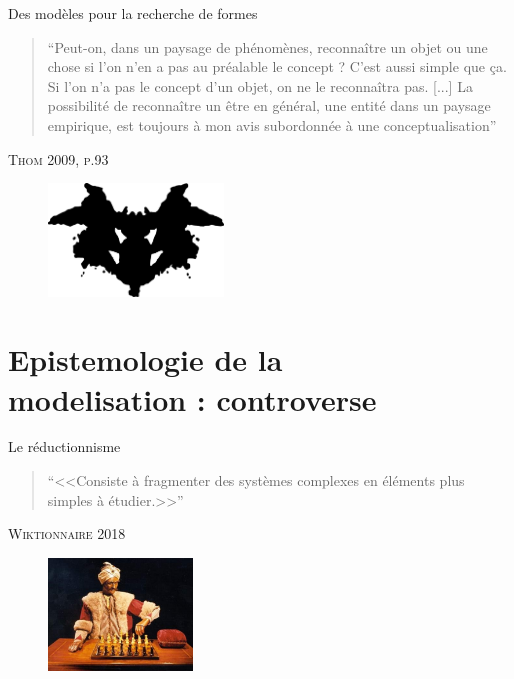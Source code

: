 \documentclass[newPxFont]{beamer}
\begin{document}
\begin{frame}[c]{Des modèles pour la recherche de formes}
\vspace{-1em}
\begin{quote}
  \enquote{Peut-on, dans un paysage de phénomènes, reconnaître un objet ou une chose si l'on n'en a pas au préalable le concept ? C'est aussi simple que ça. Si l'on n'a pas le concept d'un objet, on ne le reconnaîtra pas. [...] La possibilité de reconnaître un être en général, une entité dans un paysage empirique, est toujours à mon avis subordonnée à une conceptualisation}
\end{quote}
\hspace*{\fill}\textsc{Thom 2009, p.93}
\vspace{-0.5em}
\begin{figure}
 \includegraphics[height=3cm]{img/a_rorschach.png}
\end{figure}
\end{frame}

\section{Epistemologie de la\\ modelisation : controverse}
\begin{frame}[c]{Le réductionnisme}
\vspace{-1em}
\begin{quote}
  \enquote{<<Consiste à fragmenter des systèmes complexes en éléments plus simples à étudier.>>}
\end{quote}
\hspace*{\fill}\textsc{Wiktionnaire 2018}
\vspace{-0.5em}
\begin{figure}
 \includegraphics[height=3cm]{img/a_turc_automaton.jpg}
\end{figure}
\end{frame}
\end{document}
